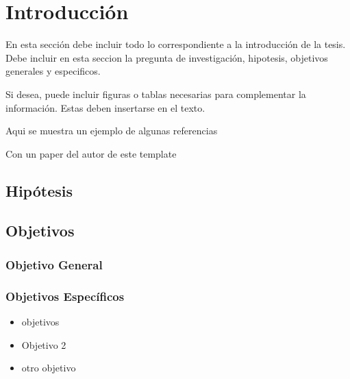 \chapter{Introducción}
En esta sección debe incluir todo lo correspondiente a la introducción de la tesis. 
Debe incluir en esta seccion la pregunta de investigación, hipotesis, objetivos generales y especificos.

Si desea, puede incluir figuras o tablas necesarias para complementar la información.
Estas deben insertarse en el texto.

Aqui se muestra un ejemplo de algunas referencias
\cite{godoyNamedEntityRecognition2023, torresPredictingCardiovascularRehabilitation2023}

Con un paper del autor de este template \citeauthor{melladoDeepLearningClassifier2023}

\section{Hipótesis}

\section{Objetivos}
\subsection{Objetivo General}

\subsection{Objetivos Específicos}
\begin{itemize}
    \item objetivos
    \item Objetivo 2
    \item otro objetivo  
\end{itemize}
